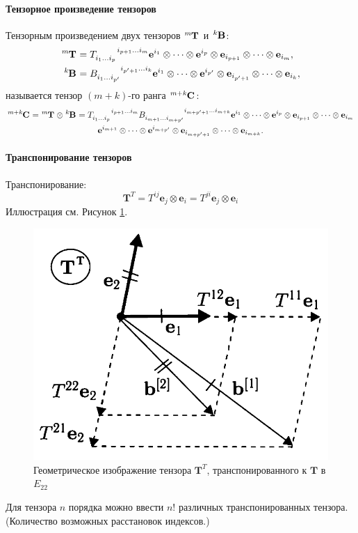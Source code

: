 \paragraph{Тензорное произведение тензоров}
Тензорным произведением двух тензоров $\tensor[^m]{\mathbf{T}}{}$ и $\tensor[^k]{\mathbf{B}}{}$:
\begin{align*}
	\tensor[^m]{\mathbf{T}}{} &= \tensor{T}{_{i_1\dots i_p}^{i_{p+1}\dots i_m}}\mathbf{e}^{i_1}\otimes\dots\otimes\mathbf{e}^{i_p}\otimes\mathbf{e}_{i_{p+1}}\otimes\dots\otimes\mathbf{e}_{i_m},\\
	\tensor[^k]{\mathbf{B}}{} &= \tensor{B}{_{i_1\dots i_{p'}}^{i_{p'+1}\dots i_k}}\mathbf{e}^{i_1}\otimes\dots\otimes\mathbf{e}^{i_{p'}}\otimes\mathbf{e}_{i_{p'+1}}\otimes\dots\otimes\mathbf{e}_{i_k},
\end{align*}
называется тензор $(m+k)$-го ранга $\tensor[^{m+k}]{\mathbf{C}}{}$:
\begin{multline*}
	\tensor[^{m+k}]{\mathbf{C}}{} = \tensor[^m]{\mathbf{T}}{}\otimes\tensor[^k]{\mathbf{B}}{}=
	\tensor{T}{_{i_1\dots i_p}^{i_{p+1}\dots i_m}}\tensor{B}{_{i_{m+1}\dots i_{m+p'}}^{i_{m+p'+1}\dots i_{m+k}}}\mathbf{e}^{i_1}\otimes\dots\otimes\mathbf{e}^{i_p}\otimes\mathbf{e}_{i_{p+1}}\otimes\dots\otimes\mathbf{e}_{i_m}\\
	\mathbf{e}^{i_{m+1}}\otimes\dots\otimes\mathbf{e}^{i_{m+p'}}\otimes\mathbf{e}_{i_{m+p'+1}}\otimes\dots\otimes\mathbf{e}_{i_{m+k}}.
\end{multline*}
\paragraph{Транспонирование тензоров}
Транспонирование:
\begin{equation*}
	\mathbf{T}^T=T^{ij}\mathbf{e}_j\otimes\mathbf{e}_i=T^{ji}\mathbf{e}_j\otimes\mathbf{e}_i
\end{equation*}
Иллюстрация см. Рисунок \ref{fig:que3}.
\begin{figure}[H]
	\centering
	\includegraphics[width=0.5\linewidth]{img/que3}
	\caption{Геометрическое изображение тензора $\mathbf{T}^T$, транспонированного к $\mathbf{T}$ в $E_{22}$}
	\label{fig:que3}
\end{figure}
\begin{remark}
	Для тензора $n$ порядка можно ввести $n!$ различных транспонированных тензора. (Количество возможных расстановок индексов.)
\end{remark}

